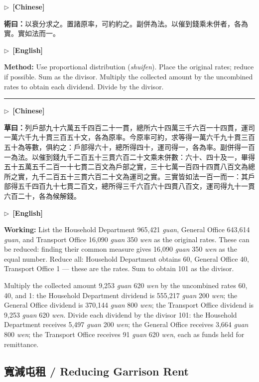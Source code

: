 \documentclass[10pt,a4paper]{article}
\newcommand{\longline}{\par\noindent\rule{\textwidth}{0.4pt}\par}
\newcommand{\CNmarker}{\noindent\textcolor{cnlabel}{$\triangleright$\ \textbf{[Chinese]}}\par}
\newcommand{\ENmarker}{\noindent\textcolor{enlabel}{$\triangleright$\ \textbf{[English]}}\par}
\newcommand{\Method}[1]{\par\noindent\textbf{\color{methodcolor}術曰：}#1\par}
\newcommand{\Working}[1]{\par\noindent\textbf{\color{workingcolor}草曰：}#1\par}
\newcommand{\MethodEn}[1]{\par\noindent\textbf{\color{methodcolor}Method:} #1\par}
\newcommand{\WorkingEn}[1]{\par\noindent\textbf{\color{workingcolor}Working:} #1\par}
\begin{document}
\CNmarker
\Method{以衰分求之。置諸原率，可約約之。副併為法。以催到錢乘未併者，各為實。實如法而一。}

\ENmarker
\MethodEn{Use proportional distribution (\textit{shuifen}). Place the original rates; reduce if possible. Sum as the divisor. Multiply the collected amount by the uncombined rates to obtain each dividend. Divide by the divisor.}

\longline

\CNmarker
\Working{列戶部九十六萬五千四百二十一貫，總所六十四萬三千六百一十四貫，運司一萬六千九十貫三百五十文，各為原率。今原率可約，求等得一萬六千九十貫三百五十為等數，俱約之：戶部得六十，總所得四十，運司得一，各為率。副併得一百一為法。以催到錢九千二百五十三貫六百二十文乘未併數：六十、四十及一，畢得五十五萬五千二百一十七貫二百文為戶部之實，三十七萬一百四十四貫八百文為總所之實，九千二百五十三貫六百二十文為運司之實。三實皆如法一百一而一：其戶部得五千四百九十七貫二百文，總所得三千六百六十四貫八百文，運司得九十一貫六百二十，各為候解錢。}

\ENmarker
\WorkingEn{List the Household Department 965,421 \textit{guan}, General Office 643,614 \textit{guan}, and Transport Office 16,090 \textit{guan} 350 \textit{wen} as the original rates. These can be reduced: finding their common measure gives 16,090 \textit{guan} 350 \textit{wen} as the equal number. Reduce all: Household Department obtains 60, General Office 40, Transport Office 1 --- these are the rates. Sum to obtain 101 as the divisor.

Multiply the collected amount 9,253 \textit{guan} 620 \textit{wen} by the uncombined rates 60, 40, and 1: the Household Department dividend is 555,217 \textit{guan} 200 \textit{wen}; the General Office dividend is 370,144 \textit{guan} 800 \textit{wen}; the Transport Office dividend is 9,253 \textit{guan} 620 \textit{wen}. Divide each dividend by the divisor 101: the Household Department receives 5,497 \textit{guan} 200 \textit{wen}; the General Office receives 3,664 \textit{guan} 800 \textit{wen}; the Transport Office receives 91 \textit{guan} 620 \textit{wen}, each as funds held for remittance.}


\newpage
\subsection*{寬減屯租 / Reducing Garrison Rent}
\end{document}
